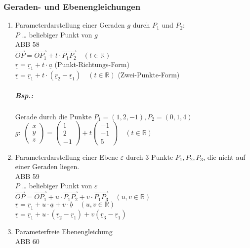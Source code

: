 \subsubsection{Geraden- und Ebenengleichungen}
\begin{enumerate}
\item Parameterdarstellung einer Geraden $g$ durch $P_1$ und $P_2$:\\
$P$ … beliebiger Punkt von $g$\\
ABB 58\\
$\overrightarrow{OP}=\overrightarrow{OP_1}+t\cdot \overrightarrow{P_1P_2} \quad ( t \in \mathbb{R})$\\
$\boxed{\underline{r}=\underline{r}_1+t \cdot \underline{a}}$ (Punkt-Richtungs-Form)\\
$\boxed{\underline{r}=\underline{r}_1 + t \cdot (\underline{r}_2-\underline{r}_1)} \quad( t \in \mathbb{R})$ (Zwei-Punkte-Form)
\subparagraph{Bsp.:} \parskp
Gerade durch die Punkte $P_1=(1,2,-1), P_2=(0,1,4)$\\
$g: \; \begin{pmatrix}
x\\
y\\
z
\end{pmatrix}=\begin{pmatrix}
1\\
2\\
-1
\end{pmatrix}+t\begin{pmatrix}
-1\\
-1\\
5
\end{pmatrix}\quad (t \in \mathbb{R})$
\item Parameterdarstellung einer Ebene $\varepsilon$ durch 3 Punkte $P_1, P_2 ,P_3$, die nicht auf einer Geraden liegen.\\
ABB 59 \\
$P$ … beliebiger Punkt von $\varepsilon$\\
$\overrightarrow{OP}=\overrightarrow{OP_1}+ u \cdot \overrightarrow{P_1P_2}+v\cdot \overrightarrow{P_1P_3} \quad (u,v \in \mathbb{R})$\\
$\boxed{\underline{r}=\underline{r}_1+u\cdot \underline{a}+v\cdot \underline{b}} \quad (u,v \in \mathbb{R})$\\
$\boxed{\underline{r}=\underline{r}_1+u\cdot (\underline{r}_2-\underline{r}_1)+v(\underline{r}_3-\underline{r}_1)}$
\item Parameterfreie Ebenengleichung\\
ABB 60\\

\end{enumerate}

